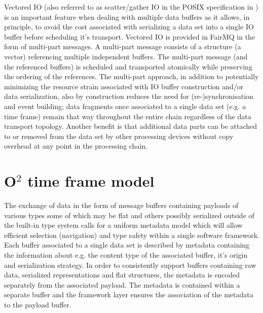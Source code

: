 \documentclass[a4paper,twoside]{article}
\newcommand\comment[1]{\color{red}{ #1 }\color{black}}
\def\O2{O$^2$}
\begin{document}
Vectored IO (also referred to as scatter/gather IO in the POSIX specification in \cite{posix}) is an important feature when dealing with multiple data buffers as it allows, in principle, to avoid the cost associated with serializing a data set into a single IO buffer before scheduling it's transport.
Vectored IO is provided in FairMQ in the form of multi-part messages. A multi-part message consists of a structure (a vector) referencing multiple independent buffers. The multi-part message (and the referenced buffers) is scheduled and transported atomically while preserving the ordering of the references.
The multi-part approach, in addition to potentially minimizing the resource strain associated with IO buffer construction and/or data serialization, also by construction reduces the need for (re-)synchronisation and event building; data fragments once associated to a single data set (e.g. a time frame) remain that way throughout the entire chain regardless of the data transport topology. Another benefit is that additional data parts can be attached to or removed from the data set by other processing devices without copy overhead at any point in the processing chain.

\comment{
In the case zero-copy vectored IO is not supported by the transport layer, compromises have to be made. One possibility is to construct a single message by serializing the contents of all the associated buffers into a single message buffer, this step can be performed transparently to the application.

Another option, if a zero-copy approach is needed, is to prevent the queues from multiplexing and load balancing messages to/from different endpoints by requiring socket-like point-to-point topologies; this, however, introduces a dependency of the data model on runtime configuration and excludes most of the high level features provided by current FairMQ backends, most notably the messaging patterns. Other options may of course exist.
}

\section{\O2 time frame model}

The exchange of data in the form of message buffers containing payloads of various types some of which may be flat and others possibly serialized outside of the built-in type system calls for a uniform metadata model which will allow efficient selection (navigation) and type safety within a single software framework.
Each buffer associated to a single data set is described by metadata containing the information about e.g. the content type of the associated buffer, it's origin and serialization strategy. In order to consistently support buffers containing raw data, serialized representations and flat structures, the metadata is encoded separately from the associated payload.
The metadata is contained within a separate buffer and the framework layer ensures the association of the metadata to the payload buffer.
\end{document}
